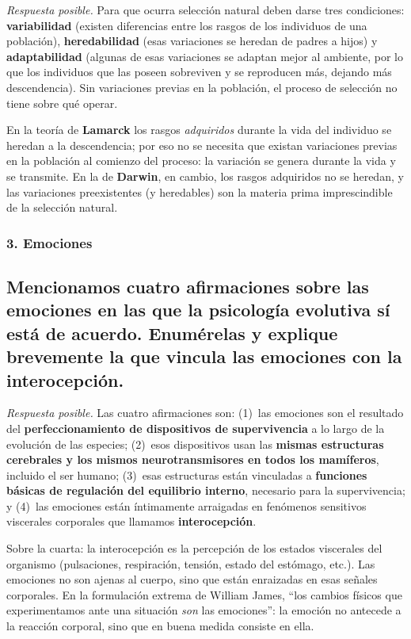 \documentclass[11pt, a4paper]{article}
\newcommand{\pregunta}[1]{\subsection{#1}}
\newcommand{\eje}[1]{\subsubsection{#1}}
\begin{document}
\begin{respuesta}
\textit{Respuesta posible.} Para que ocurra selecci\'on natural deben darse tres condiciones: \textbf{variabilidad} (existen diferencias entre los rasgos de los individuos de una poblaci\'on), \textbf{heredabilidad} (esas variaciones se heredan de padres a hijos) y \textbf{adaptabilidad} (algunas de esas variaciones se adaptan mejor al ambiente, por lo que los individuos que las poseen sobreviven y se reproducen m\'as, dejando m\'as descendencia). Sin variaciones previas en la poblaci\'on, el proceso de selecci\'on no tiene sobre qu\'e operar.

En la teor\'ia de \textbf{Lamarck} los rasgos \emph{adquiridos} durante la vida del individuo se heredan a la descendencia; por eso no se necesita que existan variaciones previas en la poblaci\'on al comienzo del proceso: la variaci\'on se genera durante la vida y se transmite. En la de \textbf{Darwin}, en cambio, los rasgos adquiridos no se heredan, y las variaciones preexistentes (y heredables) son la materia prima imprescindible de la selecci\'on natural.
\end{respuesta}

\eje{3. Emociones}
\pregunta{Mencionamos cuatro afirmaciones sobre las emociones en las que la psicolog\'ia evolutiva s\'i est\'a de acuerdo. Enum\'erelas y explique brevemente la que vincula las emociones con la interocepci\'on.}

\begin{respuesta}
\textit{Respuesta posible.} Las cuatro afirmaciones son: (1)~las emociones son el resultado del \textbf{perfeccionamiento de dispositivos de supervivencia} a lo largo de la evoluci\'on de las especies; (2)~esos dispositivos usan las \textbf{mismas estructuras cerebrales y los mismos neurotransmisores en todos los mam\'iferos}, incluido el ser humano; (3)~esas estructuras est\'an vinculadas a \textbf{funciones b\'asicas de regulaci\'on del equilibrio interno}, necesario para la supervivencia; y (4)~las emociones est\'an \'intimamente arraigadas en fen\'omenos sensitivos viscerales corporales que llamamos \textbf{interocepci\'on}.

Sobre la cuarta: la interocepci\'on es la percepci\'on de los estados viscerales del organismo (pulsaciones, respiraci\'on, tensi\'on, estado del est\'omago, etc.). Las emociones no son ajenas al cuerpo, sino que est\'an enraizadas en esas se\~nales corporales. En la formulaci\'on extrema de William James, ``los cambios f\'isicos que experimentamos ante una situaci\'on \emph{son} las emociones'': la emoci\'on no antecede a la reacci\'on corporal, sino que en buena medida consiste en ella.
\end{respuesta}
\end{document}
